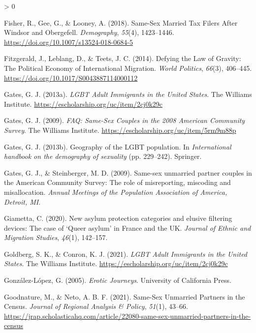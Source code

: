 \documentclass[
  11pt,
]{article}
\newlength{\cslhangindent}
\newenvironment{CSLReferences}[2] %
 {%
  \setlength{\parindent}{0pt}
  \ifodd #1 \everypar{\setlength{\hangindent}{\cslhangindent}}\ignorespaces\fi
  \ifnum #2 > 0
  \setlength{\parskip}{#2\baselineskip}
  \fi
 }%
 {}
\begin{document}
\begin{CSLReferences}{1}{0}
\leavevmode\hypertarget{ref-fisher_2018}{}%
Fisher, R., Gee, G., \& Looney, A. (2018). Same-{Sex} {Married} {Tax} {Filers} {After} {Windsor} and {Obergefell}. \emph{Demography}, \emph{55}(4), 1423--1446. \url{https://doi.org/10.1007/s13524-018-0684-5}

\leavevmode\hypertarget{ref-fitzgerald_2014}{}%
Fitzgerald, J., Leblang, D., \& Teets, J. C. (2014). Defying the {Law} of {Gravity}: {The} {Political} {Economy} of {International} {Migration}. \emph{World Politics}, \emph{66}(3), 406--445. \url{https://doi.org/10.1017/S0043887114000112}

\leavevmode\hypertarget{ref-gates_2013}{}%
Gates, G. J. (2013a). \emph{{LGBT} {Adult} {Immigrants} in the {United} {States}}. The Williams Institute. \url{https://escholarship.org/uc/item/2cj0k29c}

\leavevmode\hypertarget{ref-gates_2009a}{}%
Gates, G. J. (2009). \emph{{FAQ}: {Same}-{Sex} {Couples} in the 2008 {American} {Community} {Survey}}. The Williams Institute. \url{https://escholarship.org/uc/item/5rm9m88p}

\leavevmode\hypertarget{ref-gates_2013a}{}%
Gates, G. J. (2013b). Geography of the {LGBT} population. In \emph{International handbook on the demography of sexuality} (pp. 229--242). Springer.

\leavevmode\hypertarget{ref-gates_2009}{}%
Gates, G. J., \& Steinberger, M. D. (2009). Same-sex unmarried partner couples in the {American} {Community} {Survey}: {The} role of misreporting, miscoding and misallocation. \emph{Annual Meetings of the Population Association of America, Detroit, {MI}}.

\leavevmode\hypertarget{ref-giametta_2020}{}%
Giametta, C. (2020). New asylum protection categories and elusive filtering devices: The case of {`{Queer} asylum'} in {France} and the {UK}. \emph{Journal of Ethnic and Migration Studies}, \emph{46}(1), 142--157.

\leavevmode\hypertarget{ref-goldberg_2021}{}%
Goldberg, S. K., \& Conron, K. J. (2021). \emph{{LGBT} {Adult} {Immigrants} in the {United} {States}}. The Williams Institute. \url{https://escholarship.org/uc/item/2cj0k29c}

\leavevmode\hypertarget{ref-gonzalez-lopez_2005}{}%
González-López, G. (2005). \emph{Erotic {Journeys}}. University of California Press.

\leavevmode\hypertarget{ref-goodnature_2021}{}%
Goodnature, M., \& Neto, A. B. F. (2021). Same-{Sex} {Unmarried} {Partners} in the {Census}. \emph{Journal of Regional Analysis \& Policy}, \emph{51}(1), 43--66. \url{https://jrap.scholasticahq.com/article/22080-same-sex-unmarried-partners-in-the-census}


\end{CSLReferences}
\end{document}
